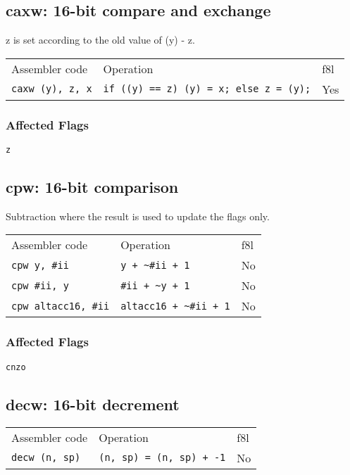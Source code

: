 \documentclass{book}
\begin{document}
\subsection{caxw: 16-bit compare and exchange}

z is set according to the old value of (y) - z.

\begin{tabular}{l l l}
Assembler code           & Operation                                     & f8l \\
\texttt{caxw (y), z, x}  & \texttt{if ((y) == z) (y) = x; else z = (y);} & Yes \\

\end{tabular}

\subsubsection*{Affected Flags}

\texttt{z}


\subsection{cpw: 16-bit comparison}

Subtraction where the result is used to update the flags only.

\begin{tabular}{l l l}
Assembler code              & Operation                        & f8l\\
\texttt{cpw y, \#ii}        & \texttt{y + \~{}\#ii + 1}        & No \\
\texttt{cpw \#ii, y}        & \texttt{\#ii + \~{}y + 1}        & No \\
\texttt{cpw altacc16, \#ii} & \texttt{altacc16 + \~{}\#ii + 1} & No \\
\end{tabular}

\subsubsection*{Affected Flags}

\texttt{cnzo}


\subsection{decw: 16-bit decrement}

\begin{tabular}{l l l}
Assembler code        & Operation                       & f8l \\
\texttt{decw (n, sp)} & \texttt{(n, sp) = (n, sp) + -1} & No \\
\end{tabular}
\end{document}
